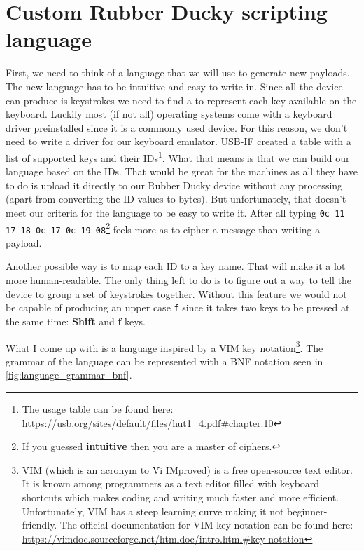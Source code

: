 \section{Custom Rubber Ducky scripting language}
\label{customLanguage}
First, we need to think of a language that we will use to generate new payloads. The new language has to be intuitive and easy to write in. Since all the device can produce is keystrokes we need to find a to represent each key available on the keyboard. Luckily most (if not all) operating systems come with a keyboard driver preinstalled since it is a commonly used device. For this reason, we don't need to write a driver for our keyboard emulator. \mbox{USB-IF} created a table with a list of supported keys and their IDs\footnote{The usage table can be found here: \url{https://usb.org/sites/default/files/hut1_4.pdf\#chapter.10}}. What that means is that we can build our language based on the IDs. That would be great for the machines as all they have to do is upload it directly to our Rubber Ducky device without any processing (apart from converting the ID values to bytes). But unfortunately, that doesn't meet our criteria for the language to be easy to write it. After all typing \verb|0c 11 17 18 0c 17 0c 19 08|\footnote{If you guessed \textbf{intuitive} then you are a master of ciphers.} feels more as to cipher a message than writing a payload.

Another possible way is to map each ID to a key name. That will make it a lot more human-readable. The only thing left to do is to figure out a way to tell the device to group a set of keystrokes together. Without this feature we would not be capable of producing an upper case \verb|f| since it takes two keys to be pressed at the same time: \textbf{Shift} and \textbf{f} keys.

What I come up with is a language inspired by a VIM key notation\footnote{VIM (which is an acronym to Vi IMproved) is a free open-source text editor. It is known among programmers as a text editor filled with keyboard shortcuts which makes coding and writing much faster and more efficient. Unfortunately, VIM has a steep learning curve making it not beginner-friendly. The official documentation for VIM key notation can be found here: \url{https://vimdoc.sourceforge.net/htmldoc/intro.html\#key-notation}}. The grammar of the language can be represented with a BNF notation seen in \autoref{fig:language_grammar_bnf}.

